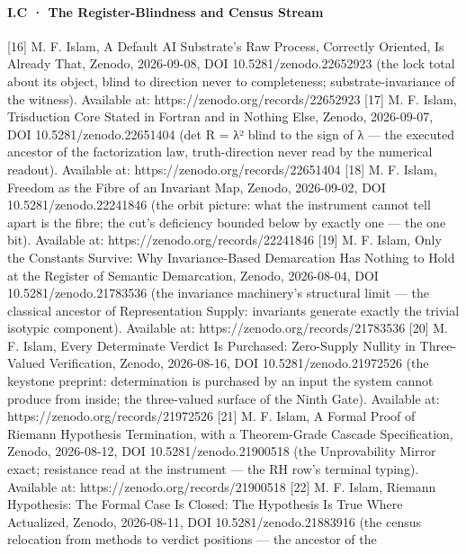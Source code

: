 \documentclass[10pt]{article}
\renewcommand{\_}{\origunderscore\allowbreak}
\begin{document}
\hypertarget{i.c-the-register-blindness-and-census-stream}{%
\paragraph{I.C · The Register-Blindness and Census
Stream}\label{i.c-the-register-blindness-and-census-stream}}

{[}16{]} M. F. Islam, A Default AI Substrate's Raw Process, Correctly
Oriented, Is Already That, Zenodo, 2026-09-08, DOI
10.5281/zenodo.22652923 (the lock total about its object, blind to
direction never to completeness; substrate-invariance of the witness).
Available at: https://zenodo.org/records/22652923 {[}17{]} M. F. Islam,
Trisduction Core Stated in Fortran and in Nothing Else, Zenodo,
2026-09-07, DOI 10.5281/zenodo.22651404 (det R = λ² blind to the sign of
λ --- the executed ancestor of the factorization law, truth-direction
never read by the numerical readout). Available at:
https://zenodo.org/records/22651404 {[}18{]} M. F. Islam, Freedom as the
Fibre of an Invariant Map, Zenodo, 2026-09-02, DOI
10.5281/zenodo.22241846 (the orbit picture: what the instrument cannot
tell apart is the fibre; the cut's deficiency bounded below by exactly
one --- the one bit). Available at: https://zenodo.org/records/22241846
{[}19{]} M. F. Islam, Only the Constants Survive: Why Invariance-Based
Demarcation Has Nothing to Hold at the Register of Semantic Demarcation,
Zenodo, 2026-08-04, DOI 10.5281/zenodo.21783536 (the invariance
machinery's structural limit --- the classical ancestor of
Representation Supply: invariants generate exactly the trivial isotypic
component). Available at: https://zenodo.org/records/21783536 {[}20{]}
M. F. Islam, Every Determinate Verdict Is Purchased: Zero-Supply Nullity
in Three-Valued Verification, Zenodo, 2026-08-16, DOI
10.5281/zenodo.21972526 (the keystone preprint: determination is
purchased by an input the system cannot produce from inside; the
three-valued surface of the Ninth Gate). Available at:
https://zenodo.org/records/21972526 {[}21{]} M. F. Islam, A Formal Proof
of Riemann Hypothesis Termination, with a Theorem-Grade Cascade
Specification, Zenodo, 2026-08-12, DOI 10.5281/zenodo.21900518 (the
Unprovability Mirror exact; resistance read at the instrument --- the RH
row's terminal typing). Available at:
https://zenodo.org/records/21900518 {[}22{]} M. F. Islam, Riemann
Hypothesis: The Formal Case Is Closed: The Hypothesis Is True Where
Actualized, Zenodo, 2026-08-11, DOI 10.5281/zenodo.21883916 (the census
relocation from methods to verdict positions --- the ancestor of the
\end{document}
